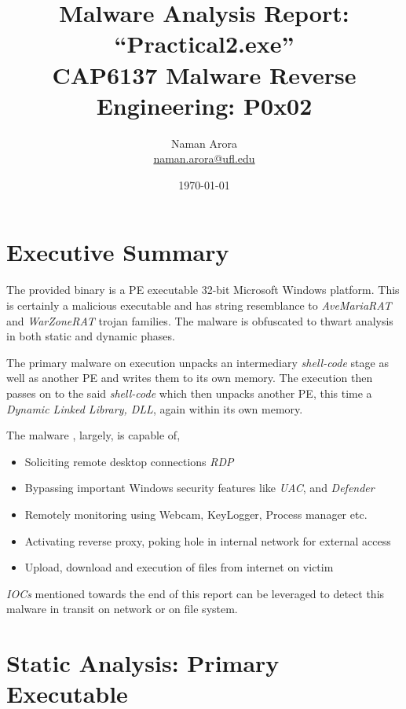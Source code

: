\documentclass[10pt,a4paper]{article}
\begin{document}

\title{Malware Analysis Report: ``Practical2.exe''\\ \vspace{-8pt} {\large CAP6137 Malware Reverse Engineering: P0x02}}
\author{{Naman Arora \\ \vspace{-10pt}\small \href{mailto:naman.arora@ufl.edu}{naman.arora@ufl.edu}}}
\date{\today}

\maketitle
\newpage
\tableofcontents
\newpage
\section{Executive Summary}
The provided binary is a PE executable 32-bit Microsoft Windows platform. This is certainly a malicious executable and has string resemblance to \textit{AveMariaRAT} and \textit{WarZoneRAT} trojan families. The malware is obfuscated to thwart analysis in both static and dynamic phases.

The primary malware on execution unpacks an intermediary \textit{shell-code} stage as well as another PE and writes them to its own memory. The execution then passes on to the said \textit{shell-code} which then unpacks another PE, this time a \textit{Dynamic Linked Library, DLL}, again within its own memory.

The malware \cite{warzone}, largely, is capable of,
\begin{itemize}
	\item Soliciting remote desktop connections \textit{RDP}
	\item Bypassing important Windows security features like \textit{UAC}, and \textit{Defender}
	\item Remotely monitoring using Webcam, KeyLogger, Process manager etc.
	\item Activating reverse proxy, poking hole in internal network for external access
	\item Upload, download and execution of files from internet on victim
\end{itemize}

\textit{IOCs} mentioned towards the end of this report can be leveraged to detect this malware in transit on network or on file system.

\newpage

\section{Static Analysis: Primary Executable}
\end{document}
